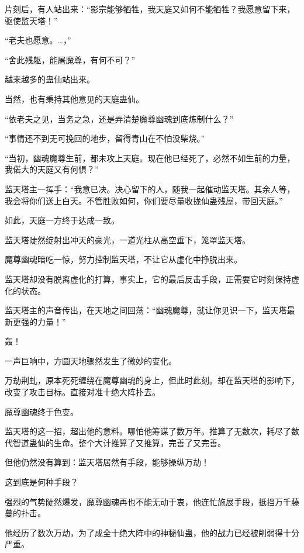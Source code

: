 
\begin{this_body}



片刻后，有人站出来：“影宗能够牺牲，我天庭又如何不能牺牲？我愿意留下来，驱使监天塔！”

“老夫也愿意。…，”

“舍此残躯，能屠魔尊，有何不可？”

越来越多的蛊仙站出来。

当然，也有秉持其他意见的天庭蛊仙。

“依老夫之见，当务之急，还是弄清楚魔尊幽魂到底炼制什么？”

“事情还不到无可挽回的地步，留得青山在不怕没柴烧。”

“当初，幽魂魔尊生前，都未攻上天庭。现在他已经死了，必然不如生前的力量，我偌大的天庭又有何惧？”

监天塔主一挥手：“我意已决。决心留下的人，随我一起催动监天塔。其余人等，我会将你们送上白天。不管胜败如何，你们要尽量收拢仙蛊残屋，带回天庭。”

如此，天庭一方终于达成一致。

监天塔陡然绽射出冲天的豪光，一道光柱从高空垂下，笼罩监天塔。

魔尊幽魂暗吃一惊，努力控制监天塔，不让它从虚化中挣脱出来。

监天塔却没有脱离虚化的打算，事实上，它的最后反击手段，正需要它时刻保持虚化的状态。

监天塔主的声音传出，在天地之间回荡：“幽魂魔尊，就让你见识一下，监天塔最新更强的力量！”

轰！

一声巨响中，方圆天地骤然发生了微妙的变化。

万劫荆虬，原本死死缠绕在魔尊幽魂的身上，但此时此刻。却在监天塔的影响下，改变了攻击目标。直接对准十绝大阵扑去。

魔尊幽魂终于色变。

监天塔的这一招，超出他的意料。哪怕他筹谋了数万年。推算了无数次，耗尽了数代智道蛊仙的生命。整个大计推算了又推算，完善了又完善。

但他仍然没有算到：监天塔居然有手段，能够操纵万劫！

这到底是何种手段？

强烈的气势陡然爆发，魔尊幽魂再也不能无动于衷，他连忙施展手段，抵挡万千藤蔓的扑击。

他经历了数次万劫，为了成全十绝大阵中的神秘仙蛊，他的战力已经被削弱得十分严重。


\end{this_body}
